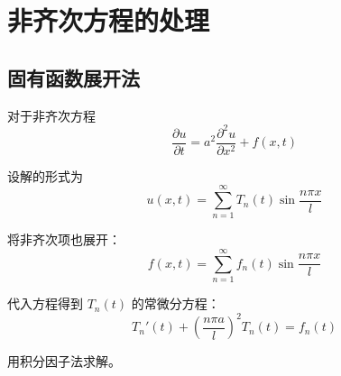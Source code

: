 \section{非齐次方程的处理}

\subsection{固有函数展开法}

对于非齐次方程
\begin{equation}
    \frac{\partial u}{\partial t} = a^2\frac{\partial^2 u}{\partial x^2} + f(x, t)
\end{equation}

设解的形式为
\begin{equation}
    u(x, t) = \sum_{n=1}^{\infty} T_n(t)\sin\frac{n\pi x}{l}
\end{equation}

将非齐次项也展开：
\begin{equation}
    f(x, t) = \sum_{n=1}^{\infty} f_n(t)\sin\frac{n\pi x}{l}
\end{equation}

代入方程得到 $T_n(t)$ 的常微分方程：
\begin{equation}
    T_n'(t) + \left(\frac{n\pi a}{l}\right)^2 T_n(t) = f_n(t)
\end{equation}

用积分因子法求解。

